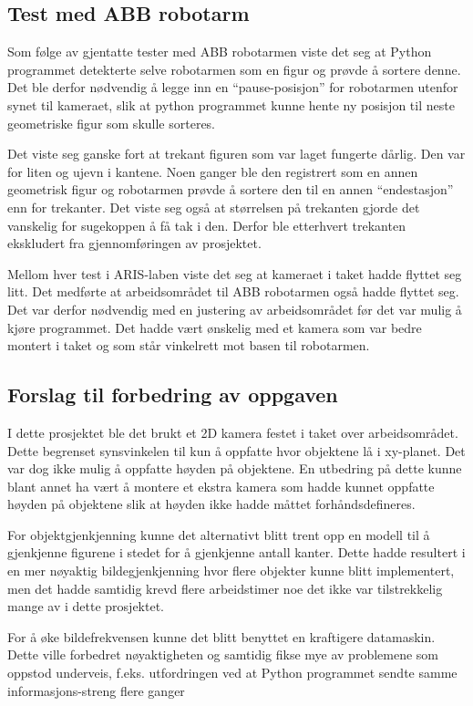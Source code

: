 \documentclass[conference]{IEEEtran}
\begin{document}
    \subsection{Test med ABB robotarm}
        Som følge av gjentatte tester med ABB robotarmen viste det seg at Python programmet detekterte selve robotarmen som en figur og prøvde å sortere denne. Det ble derfor nødvendig å legge inn en “pause-posisjon” for robotarmen utenfor synet til kameraet, slik at python programmet kunne hente ny posisjon til neste geometriske figur som skulle sorteres.

        Det viste seg ganske fort at trekant figuren som var laget fungerte dårlig. Den var for liten og ujevn i kantene. Noen ganger ble den registrert som en annen geometrisk figur og robotarmen prøvde å sortere den til en annen \enquote{endestasjon} enn for trekanter. Det viste seg også at størrelsen på trekanten gjorde det vanskelig for sugekoppen å få tak i den. Derfor ble etterhvert trekanten ekskludert fra gjennomføringen av prosjektet. 

        Mellom hver test i ARIS-laben viste det seg at kameraet i taket hadde flyttet seg litt. Det medførte at arbeidsområdet til ABB robotarmen også hadde flyttet seg. Det var derfor nødvendig med en justering av arbeidsområdet før det var mulig å kjøre programmet. Det hadde vært ønskelig med et kamera som var bedre montert i taket og som står vinkelrett mot basen til robotarmen.

    \subsection{Forslag til forbedring av oppgaven}
        I dette prosjektet ble det brukt et 2D kamera festet i taket over arbeidsområdet. Dette begrenset synsvinkelen til kun å oppfatte hvor objektene lå i xy-planet. Det var dog ikke mulig å oppfatte høyden på objektene. En utbedring på dette kunne blant annet ha vært å montere et ekstra kamera som hadde kunnet oppfatte høyden på objektene slik at høyden ikke hadde måttet forhåndsdefineres. 

        For objektgjenkjenning kunne det alternativt blitt trent opp en modell til å gjenkjenne figurene i stedet for å gjenkjenne antall kanter. Dette hadde resultert i en mer nøyaktig bildegjenkjenning hvor flere objekter kunne blitt implementert, men det hadde samtidig krevd flere arbeidstimer noe det ikke var tilstrekkelig mange av i dette prosjektet.  

        For å øke bildefrekvensen kunne det blitt benyttet en kraftigere datamaskin. Dette ville forbedret nøyaktigheten og samtidig fikse mye av problemene som oppstod underveis, f.eks. utfordringen ved at Python programmet sendte samme informasjons-streng flere ganger
\end{document}

